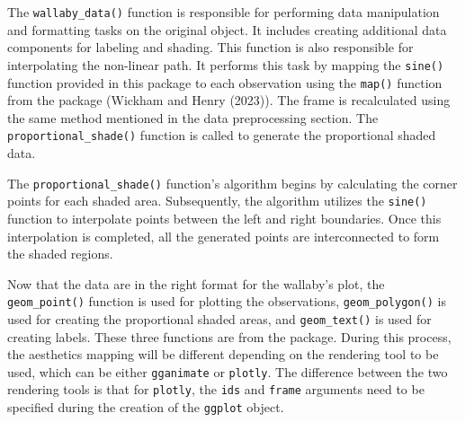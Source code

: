 The \texttt{wallaby\_data()} function is responsible for performing data manipulation and formatting tasks on the original object. It includes creating additional data components for labeling and shading. This function is also responsible for interpolating the non-linear path. It performs this task by mapping the \texttt{sine()} function provided in this package to each observation using the \texttt{map()} function from the  package (Wickham and Henry (2023)). The frame is recalculated using the same method mentioned in the data preprocessing section. The \texttt{proportional\_shade()} function is called to generate the proportional shaded data.

The \texttt{proportional\_shade()} function's algorithm begins by calculating the corner points for each shaded area. Subsequently, the algorithm utilizes the \texttt{sine()} function to interpolate points between the left and right boundaries. Once this interpolation is completed, all the generated points are interconnected to form the shaded regions.

Now that the data are in the right format for the wallaby's plot, the \texttt{geom\_point()} function is used for plotting the observations, \texttt{geom\_polygon()} is used for creating the proportional shaded areas, and \texttt{geom\_text()} is used for creating labels. These three functions are from the  package. During this process, the aesthetics mapping will be different depending on the rendering tool to be used, which can be either \texttt{gganimate} or \texttt{plotly}. The difference between the two rendering tools is that for \texttt{plotly}, the \texttt{ids} and \texttt{frame} arguments need to be specified during the creation of the \texttt{ggplot} object.

